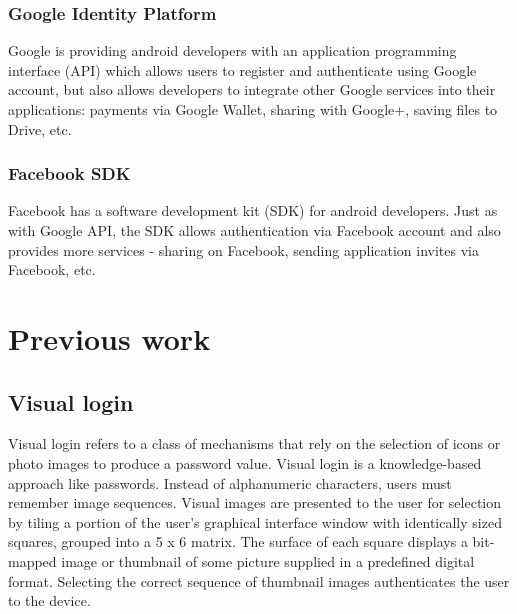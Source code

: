 \subsubsection{Google Identity Platform}
Google is providing android developers with an application programming interface (API) which allows users to register and authenticate using Google account, but also allows developers to integrate other Google services into their applications: payments via Google Wallet, sharing with Google+, saving files to Drive, etc. \cite{googleidentityplatform}

\subsubsection{Facebook SDK}
Facebook has a software development kit (SDK) for android developers. Just as with Google API, the SDK allows authentication via Facebook account and also provides more services - sharing on Facebook, sending application invites via Facebook, etc. \cite{facebooksdk}


\section{Previous work}

\subsection{Visual login}
Visual login refers to a class of mechanisms that rely on the selection of icons or photo images to produce a
password value. Visual login is a knowledge-based approach like passwords. Instead of alphanumeric characters, users must remember image sequences. Visual images are presented to the user for selection by tiling a portion of the user’s graphical interface window with identically sized squares, grouped into a 5 x 6 matrix. The surface of each square displays a bit-mapped image or thumbnail of some picture supplied in a predefined digital format. Selecting the correct sequence of thumbnail images authenticates the user to the device. \cite{jansen2003authenticating}

